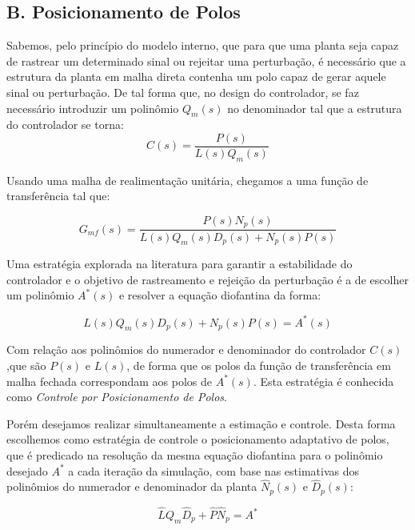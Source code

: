 \documentclass[conference,harvard,brazil,english]{sbatex}
\begin{document}
\subsection*{B. Posicionamento de Polos}

Sabemos, pelo princípio do modelo interno, que para que uma planta seja capaz de rastrear um determinado sinal ou rejeitar uma perturbação, é necessário que a estrutura da planta em malha direta contenha um polo capaz de gerar aquele sinal ou perturbação. De tal forma que, no design do controlador, se faz necessário introduzir um polinômio $Q_m(s)$ no denominador tal que a estrutura do controlador se torna:
\begin{equation}
C(s) = \frac{P(s)}{L(s)Q_m(s)}
\end{equation}

Usando uma malha de realimentação unitária, chegamos a uma função de transferência tal que:

\begin{equation}
G_{mf}(s) = \frac{P(s)N_p(s)}{L(s)Q_m(s)D_p(s) + N_p(s)P(s)}
\end{equation}

Uma estratégia explorada na literatura \cite{chen,ogata} para garantir a estabilidade do controlador e o objetivo de rastreamento e rejeição da perturbação é a de escolher um polinômio $A^*(s)$ e resolver a equação diofantina da forma:

\begin{equation}
L(s)Q_m(s)D_p(s) + N_p(s)P(s) = A^*(s)
\end{equation}

Com relação aos polinômios do numerador e denominador do controlador $C(s)$,que são $P(s)$ e $L(s)$, de forma que os polos da função de transferência em malha fechada correspondam aos polos de $A^*(s)$. Esta estratégia é conhecida como \emph{Controle por Posicionamento de Polos}.

Porém desejamos realizar simultaneamente a estimação e controle. Desta forma escolhemos como estratégia de controle o posicionamento adaptativo de polos, que é predicado na resolução da mesma equação diofantina para o polinômio desejado $A^*$ a cada iteração da simulação, com base nas estimativas dos polinômios do numerador e denominador da planta $\hat{N}_p(s)$ e $\hat{D}_p(s)$:

\begin{equation}
\hat{L} Q_m \hat{D}_p + \hat{P} \hat{N}_p = A^*
\end{equation}
\end{document}
